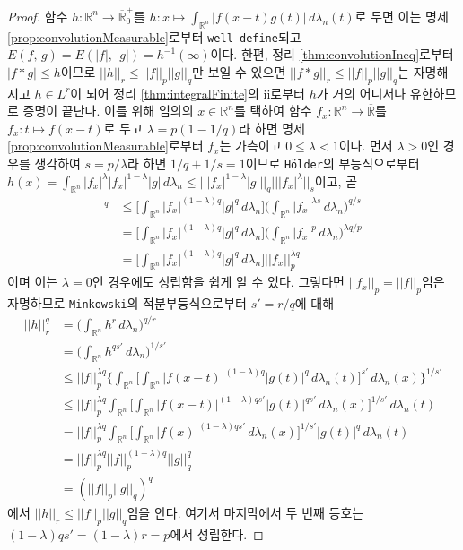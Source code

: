 \begin{proof}
    함수 $h:\mathbb{R}^n\to\overline{\mathbb{R}}^+_0$를 $h:x\mapsto\int_{\mathbb{R}^n}|f(x-t)g(t)|\,d\lambda_n(t)$로 두면 이는 명제 \ref{prop:convolutionMeasurable}로부터 \texttt{well-define}되고 $E(f,\,g)=E(|f|,\,|g|)=h^{-1}(\infty)$이다. 한편, 정리 \ref{thm:convolutionIneq}로부터 $|f*g|\leq h$이므로 $||h||_r\leq||f||_p||g||_q$만 보일 수 있으면 $||f*g||_r\leq||f||_p||g||_q$는 자명해지고 $h\in L^r$이 되어 정리 \ref{thm:integralFinite}의 ii로부터 $h$가 거의 어디서나 유한하므로 증명이 끝난다. 이를 위해 임의의 $x\in\mathbb{R}^n$를 택하여 함수 $f_x:\mathbb{R}^n\to\overline{\mathbb{R}}$를 $f_x:t\mapsto f(x-t)$로 두고 $\lambda=p(1-1/q)$라 하면 명제 \ref{prop:convolutionMeasurable}로부터 $f_x$는 가측이고 $0\leq\lambda<1$이다. 먼저 $\lambda>0$인 경우를 생각하여 $s=p/\lambda$라 하면 $1/q+1/s=1$이므로 \texttt{H\"older}의 부등식으로부터 $h(x)=\int_{\mathbb{R}^n}|f_x|^\lambda|f_x|^{1-\lambda}|g|\,d\lambda_n\leq|||f_x|^{1-\lambda}|g|||_q|||f_x|^\lambda||_s$이고, 곧
    \begin{align*}
        [h(x)]^q&\leq\bigg[\int_{\mathbb{R}^n}|f_x|^{(1-\lambda)q}|g|^q\,d\lambda_n\bigg]\bigg(\int_{\mathbb{R}^n}|f_x|^{\lambda s}\,d\lambda_n\bigg)^{q/s}\\
        &=\bigg[\int_{\mathbb{R}^n}|f_x|^{(1-\lambda)q}|g|^q\,d\lambda_n\bigg]\bigg(\int_{\mathbb{R}^n}|f_x|^p\,d\lambda_n\bigg)^{\lambda q/p}\\
        &=\bigg[\int_{\mathbb{R}^n}|f_x|^{(1-\lambda)q}|g|^q\,d\lambda_n\bigg]||f_x||_p^{\lambda q}
    \end{align*}
    이며 이는 $\lambda=0$인 경우에도 성립함을 쉽게 알 수 있다. 그렇다면 $||f_x||_p=||f||_p$임은 자명하므로 \texttt{Minkowski}의 적분부등식으로부터 $s'=r/q$에 대해
    \begin{align*}
        ||h||_r^q&=\bigg(\int_{\mathbb{R}^n}h^r\,d\lambda_n\bigg)^{q/r}\\
        &=\bigg(\int_{\mathbb{R}^n}h^{qs'}\,d\lambda_n\bigg)^{1/s'}\\
        &\leq||f||_p^{\lambda q}\bigg\{\int_{\mathbb{R}^n}\bigg[\int_{\mathbb{R}^n}|f(x-t)|^{(1-\lambda)q}|g(t)|^q\,d\lambda_n(t)\bigg]^{s'}\,d\lambda_n(x)\bigg\}^{1/s'}\\
        &\leq||f||_p^{\lambda q}\int_{\mathbb{R}^n}\bigg[\int_{\mathbb{R}^n}|f(x-t)|^{(1-\lambda)qs'}|g(t)|^{qs'}\,d\lambda_n(x)\bigg]^{1/s'}\,d\lambda_n(t)\\
        &=||f||_p^{\lambda q}\int_{\mathbb{R}^n}\bigg[\int_{\mathbb{R}^n}|f(x)|^{(1-\lambda)qs'}\,d\lambda_n(x)\bigg]^{1/s'}|g(t)|^{q}\,d\lambda_n(t)\\
        &=||f||_p^{\lambda q}||f||_p^{(1-\lambda)q}||g||_q^q\\
        &=(||f||_p||g||_q)^q
    \end{align*}
    에서 $||h||_r\leq||f||_p||g||_q$임을 안다. 여기서 마지막에서 두 번째 등호는 $(1-\lambda)qs'=(1-\lambda)r=p$에서 성립한다.
\end{proof}


